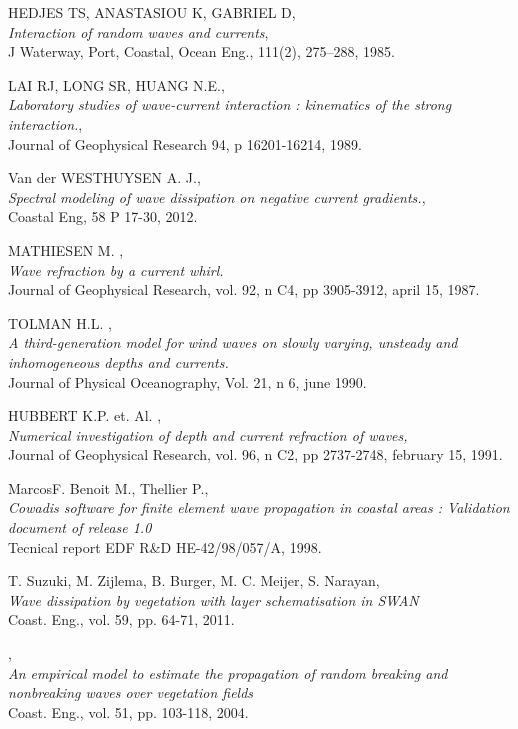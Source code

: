 \begin{thebibliography}{99}
  {\sc HEDJES TS, ANASTASIOU K, GABRIEL D},\\ 
{\em  Interaction of random waves and currents},\\
 J Waterway, Port, Coastal, Ocean Eng., 111(2), 275–288, 1985.

  {\sc LAI RJ, LONG SR, HUANG N.E.},\\
 {\em  Laboratory studies of wave-current interaction : kinematics of the strong interaction.},\\
 Journal of Geophysical Research 94, p 16201-16214, 1989.

  {\sc Van der WESTHUYSEN A. J.},\\
 {\em Spectral modeling of wave dissipation on negative current gradients.},\\
Coastal Eng, 58 P 17-30, 2012.

 {\sc MATHIESEN M. },\\
 {\em Wave refraction by a current whirl.}\\
 Journal of Geophysical Research, vol. 92, n C4, pp 3905-3912, april 15, 1987.

 {\sc TOLMAN H.L. },\\
 {\em  A third-generation model for wind waves on slowly varying, unsteady and inhomogeneous depths and currents.}\\
 Journal of Physical Oceanography, Vol. 21, n 6, june 1990.

 {\sc HUBBERT K.P. et. Al. },\\
 {\em Numerical investigation of depth and current refraction of waves,}\\
 Journal of Geophysical Research, vol. 96, n C2, pp 2737-2748, february 15, 1991.

 {\sc MarcosF. Benoit M., Thellier P.},\\
 {\em Cowadis software for finite element wave propagation in coastal areas : Validation document of release 1.0}\\
Tecnical report EDF R\&D HE-42/98/057/A, 1998.

 {\sc T. Suzuki, M. Zijlema, B. Burger, M. C. Meijer, S. Narayan},\\
 {\em Wave dissipation by vegetation with layer schematisation in SWAN}\\
Coast. Eng., vol. 59, pp. 64-71, 2011.

,\\
 {\em An empirical model to estimate the propagation of random breaking and nonbreaking waves over vegetation fields}\\
 Coast. Eng., vol. 51, pp. 103-118, 2004.


\end{thebibliography}
